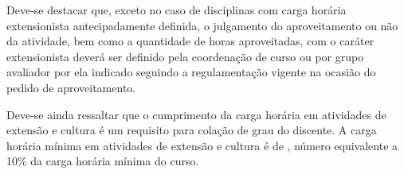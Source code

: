 Deve-se destacar que, exceto no caso de disciplinas com carga horária extensionista antecipadamente definida, o julgamento do aproveitamento ou não da atividade, bem como a quantidade de horas aproveitadas, com o caráter extensionista deverá ser definido pela coordenação de curso ou por grupo avaliador por ela indicado seguindo a regulamentação vigente na ocasião do pedido de aproveitamento.

Deve-se ainda ressaltar que o cumprimento da carga horária em atividades de extensão e cultura é um requisito para colação de grau do discente. A carga horária mínima em atividades de extensão e cultura é de , número equivalente a 10\% da carga horária mínima do curso.